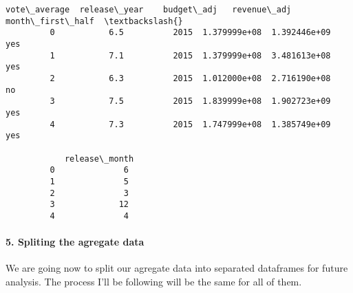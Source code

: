 \documentclass[11pt]{article}
\begin{document}
\begin{Verbatim}[commandchars=\\\{\}]
            vote\_average  release\_year    budget\_adj   revenue\_adj month\_first\_half  \textbackslash{}
         0           6.5          2015  1.379999e+08  1.392446e+09              yes   
         1           7.1          2015  1.379999e+08  3.481613e+08              yes   
         2           6.3          2015  1.012000e+08  2.716190e+08               no   
         3           7.5          2015  1.839999e+08  1.902723e+09              yes   
         4           7.3          2015  1.747999e+08  1.385749e+09              yes   
         
            release\_month  
         0              6  
         1              5  
         2              3  
         3             12  
         4              4  
\end{Verbatim}
            
    \paragraph{5. Spliting the agregate
data}\label{spliting-the-agregate-data}

    We are going now to split our agregate data into separated dataframes
for future analysis. The process I'll be following will be the same for
all of them.
\end{document}
